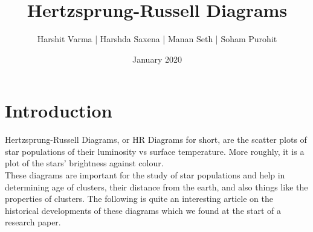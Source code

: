 \documentclass{article}
\begin{document}
\title{\textbf{\Huge Hertzsprung-Russell Diagrams}}
\author{\large Harshit Varma |  Harshda Saxena |  Manan Seth  |   Soham Purohit}
\date{January 2020}
\maketitle

\section{Introduction}
\large Hertzsprung-Russell Diagrams, or HR Diagrams for short, are the scatter plots of star populations of their luminosity vs surface temperature. More roughly, it is a plot of the stars' brightness against colour.\\ 
These diagrams are important for the study of star populations and help in determining age of clusters, their distance from the earth, and also things like the properties of clusters.\newline\newline
The following is quite an interesting article \parencite{valls-gabaud_2014} on the historical developments of these diagrams which we found at the start of a research paper.\newline\newline
\end{document}
